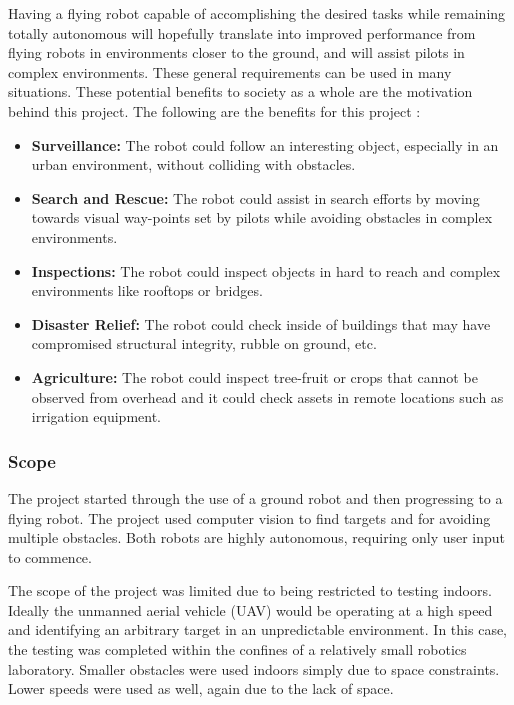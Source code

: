 \documentclass{article}[12]
\begin{document}
		Having a flying robot capable of accomplishing the desired tasks while remaining totally autonomous will hopefully translate into improved performance from flying robots in environments closer to the ground, and will assist pilots in complex environments. These general requirements can be used in many situations. These potential benefits to society as a whole are the motivation behind this project. The following are the benefits for this project :
		\begin{itemize}
			\item \textbf{Surveillance:} The robot could follow an interesting object, especially in an urban environment, without colliding with obstacles.
			\item \textbf{Search and Rescue:} The robot could assist in search efforts by moving towards visual way-points set by pilots while avoiding obstacles in complex environments.
			\item \textbf{Inspections:} The robot could inspect objects in hard to reach and complex environments like rooftops or bridges.
			\item \textbf{Disaster Relief:} The robot could check inside of buildings that may have compromised structural integrity, rubble on ground, etc.
			\item \textbf{Agriculture:} The robot could inspect tree-fruit or crops that cannot be observed from overhead and it could check assets in remote locations such as irrigation equipment.
		\end{itemize}

		\subsubsection{Scope}
	
		The project started through the use of a ground robot and then progressing to a flying robot. The project used computer vision to find targets and for avoiding multiple obstacles. Both robots are highly autonomous, requiring only user input to commence. 

		The scope of the project was limited due to being restricted to testing indoors. Ideally the unmanned aerial vehicle (UAV) would be operating at a high speed and identifying an arbitrary target in an unpredictable environment. In this case, the testing was completed within the confines of a relatively small robotics laboratory. Smaller obstacles were used indoors simply due to space constraints. Lower speeds were used as well, again due to the lack of space. 
\end{document}
